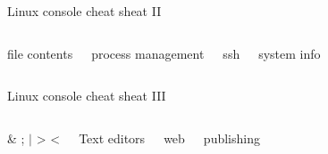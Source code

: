 \documentclass{beamer}
\begin{document}
\begin{frame}[fragile]{Linux console cheat sheat II}
  \fontsize{7pt}{7}\selectfont
  \begin{columns}
    \begin{block}{file contents}
      
    \end{block}
    \begin{block}{process management}
      
    \end{block}

    \begin{block}{ssh}
      
    \end{block}
    \begin{block}{system info}
      
    \end{block}
  \end{columns}
\end{frame}


\begin{frame}[fragile]{Linux console cheat sheat III}
  \fontsize{7pt}{7}\selectfont
  \begin{columns}
    \begin{block}{\& ; $|$ > <}
      
    \end{block}
    \begin{block}{Text editors}
      
    \end{block}

    \begin{block}{web}
      
    \end{block}
    \begin{block}{publishing}
      
    \end{block}
  \end{columns}
\end{frame}
\end{document}
